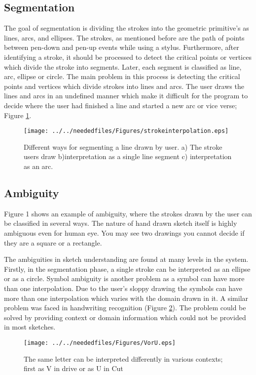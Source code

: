 \subsection {Segmentation}
The goal of segmentation is dividing the strokes into the geometric primitive's as lines, arcs, and ellipses. The strokes, as mentioned before are the path of points between pen-down and pen-up events while using a stylus. Furthermore, after identifying a stroke, it should be processed to detect the critical points or vertices which divide the stroke into segments. Later, each segment is classified as line, arc, ellipse or circle. The main problem in this process is detecting the critical points and vertices which divide strokes into lines and arcs. The user draws the lines and arcs in an undefined manner which make it difficult for the program to decide where the user had finished a line and started a new arc or vice verse;  Figure \ref {fig:strokeinterpolation}.
\begin{figure}

\begin{center}
		\texttt{[image: ../../neededfiles/Figures/strokeinterpolation.eps]}
	\caption[Segmentation error]{Different ways for segmenting a line drawn by user. a) The stroke users draw b)interpretation as a single line segment c) interpretation as an arc.}
	\label{fig:strokeinterpolation}
\end{center}
\end{figure}

\subsection{Ambiguity}
Figure 1 shows an example of ambiguity, where the strokes drawn by the user can be classified in several ways. The nature of hand drawn sketch itself is highly ambiguous even for human eye. You may see two drawings you cannot decide if they are a square or a rectangle.

The ambiguities in sketch understanding are found at many levels in the system. Firstly, in the segmentation phase, a single stroke can be interpreted as an ellipse or as a circle. Symbol ambiguity is another problem as a symbol can have more than one interpolation. Due to the user's sloppy drawing the symbols can have more than one interpolation which varies with the domain drawn in it. A similar problem was faced in handwriting recognition (Figure \ref{fig:VorU}). The problem could be solved by providing context or domain information which could not be provided in most sketches. 
\begin{figure}	
	\centering
		\texttt{[image: ../../neededfiles/Figures/VorU.eps]}
	\caption[Ambiguities Handwriting] { The same letter can be interpreted differently in various contexts; first as V in drive or as U in Cut}
\label{fig:VorU}
\end{figure} 	


